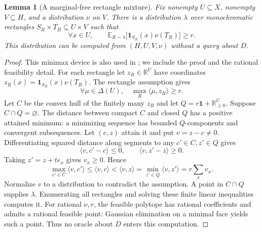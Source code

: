 \documentclass[11pt]{article}
\newtheorem{lemma}[theorem]{Lemma}
\newcommand{\R}{\mathbb R}
\newcommand{\E}{\mathbb E}
\newcommand{\1}{\mathbf 1}
\begin{document}
\begin{lemma}[A marginal-free rectangle mixture]\label{lem:mixture}
Fix nonempty $U\subseteq X$, nonempty $V\subseteq H$, and a distribution $\nu$ on $V$. There is a distribution $\lambda$ over monochromatic rectangles $S_R\times T_R\subseteq U\times V$ such that
\begin{equation}\label{eq:coverage}
 \forall x\in U,\qquad
 \E_{R\sim\lambda}\bigl[\1_{S_R}(x)\nu(T_R)\bigr]\ge r.
\end{equation}
This distribution can be computed from $(H,U,V,\nu)$ without a query about $D$.
\end{lemma}
\begin{proof}
This minimax device is also used in \citet[Theorem~3.1]{HHPTZ22}; we include the proof and the rational feasibility detail. For each rectangle let $z_R\in\R^U$ have coordinates $z_R(x)=\1_{S_R}(x)\nu(T_R)$. The rectangle assumption gives
\[
 \forall\mu\in\Delta(U),\quad \max_R\langle\mu,z_R\rangle\ge r.
\]
Let $C$ be the convex hull of the finitely many $z_R$ and let $Q=r\1+\R_{\ge0}^U$. Suppose $C\cap Q=\varnothing$. The distance between compact $C$ and closed $Q$ has a positive attained minimum: a minimizing sequence has bounded $Q$-components and convergent subsequences. Let $(c,z)$ attain it and put $v=z-c\ne0$. Differentiating squared distance along segments to any $c'\in C,z'\in Q$ gives
\[
 \langle v,c'-c\rangle\le0,\qquad\langle v,z'-z\rangle\ge0.
\]
Taking $z'=z+te_x$ gives $v_x\ge0$. Hence
\[
 \max_{c'\in C}\langle v,c'\rangle
 \le\langle v,c\rangle<\langle v,z\rangle
 =\min_{z'\in Q}\langle v,z'\rangle=r\sum_xv_x.
\]
Normalize $v$ to a distribution to contradict the assumption. A point in $C\cap Q$ supplies $\lambda$. Enumerating all rectangles and solving these finite linear inequalities computes it. For rational $\nu,r$, the feasible polytope has rational coefficients and admits a rational feasible point: Gaussian elimination on a minimal face yields such a point. Thus no oracle about $D$ enters this computation.
\end{proof}
\end{document}

